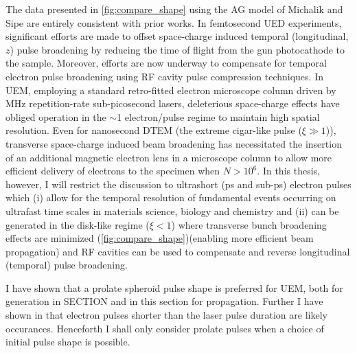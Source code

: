 The data presented in \ref{fig:compare_shape} using the AG model of Michalik and Sipe \cite{michalik_analytic_2006} are entirely consistent with prior works.\cite{reed_femtosecond_2006,siwick_ultrafast_2002}
In femtosecond UED experiments, significant efforts are made to offset space-charge induced temporal (longitudinal, $z$) pulse broadening by reducing the time of flight from the gun photocathode to the sample.\cite{siwick_ultrafast_2002,reed_evolution_2009}
Moreover, efforts are now underway to compensate for temporal electron pulse broadening using RF cavity pulse compression techniques.\cite{oudheusden_electron_2007}
In UEM, employing a standard retro-fitted electron microscope column driven by MHz repetition-rate sub-picosecond lasers,\cite{lobastov_four-dimensional_2005} deleterious space-charge effects have obliged operation in the $\sim$1 electron/pulse regime to maintain high spatial resolution.
Even for nanosecond DTEM (the extreme cigar-like pulse ($\xi \gg 1 $)), transverse space-charge induced beam broadening has necessitated the insertion of an additional magnetic electron lens in a microscope column to allow more efficient delivery of electrons to the specimen when $ N > 10^{6} $.\cite{lagrange_nanosecond_2008}
In this thesis, however, I will restrict the discussion to ultrashort (ps and sub-ps) electron pulses which (i) allow for the temporal resolution of fundamental events occurring on ultrafast time scales in materials science, biology and chemistry \cite{king_ultrafast_2005} and (ii) can be generated in the disk-like regime ($ \xi < 1 $) where transverse bunch broadening effects are minimized (\ref{fig:compare_shape})(enabling more efficient beam propagation) and RF cavities can be used to compensate and reverse longitudinal (temporal) pulse broadening.\cite{veisz_hybrid_2007}

I have shown that a prolate spheroid pulse shape is preferred for UEM, both for generation in SECTION %
and in this section for propagation.
Further I have shown in %
that electron pulses shorter than the laser pulse duration are likely occurances.
Henceforth I shall only consider prolate pulses when a choice of initial pulse shape is possible.

